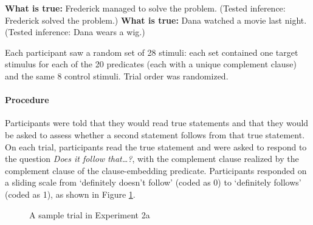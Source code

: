 \documentclass[11pt,fleqn]{article}
\newcommand{\6}{\mbox{$[\hspace*{-.6mm}[$}}
\newcommand{\9}{\mbox{$]\hspace*{-.6mm}]$}}
\begin{document}
\begin{exe}
\ex\label{control-good2} {\bf What is true:} Frederick managed to solve the problem. (Tested inference: Frederick solved the problem.)
\ex\label{control-bad2}  {\bf What is true:} Dana watched a movie last night. (Tested inference: Dana wears a wig.)
\end{exe}

Each participant saw a random set of 28 stimuli: each set contained one target stimulus for each of the 20 predicates (each with a unique complement clause) and the same 8 control stimuli. Trial order was randomized.

\paragraph{Procedure} Participants were told that they would read true statements and that they would be asked to assess whether a second statement follows from that true statement. On each trial, participants read the true statement and were asked to respond to the question {\em Does it follow that\ldots?}, with the complement clause realized by the complement clause of the clause-embedding predicate. Participants responded on a sliding scale from `definitely doesn't follow' (coded as 0) to `definitely follows' (coded as 1), as shown in Figure \ref{f-trial-exp3}.

\begin{figure}[H]
\begin{center}
\end{center}
\caption{A sample trial in Experiment 2a}\label{f-trial-exp3}
\end{figure}
\end{document}
